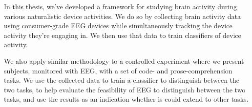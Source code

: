 

In this thesis, we've developed a framework for studying brain activity during various naturalistic device activities. We do so by collecting brain activity data using consumer-grade EEG devices while simultaneously tracking the device activity they're engaging in. We then use that data to train classifiers of device activity.

We also apply similar methodology to a controlled experiment where we present subjects, monitored with EEG, with a set of code- and prose-comprehension tasks. We use the collected data to train a classifier to distinguish between the two tasks, to help evaluate the feasibility of EEG to distinguish between the two tasks, and use the results as an indication whether is could extend to other tasks.
